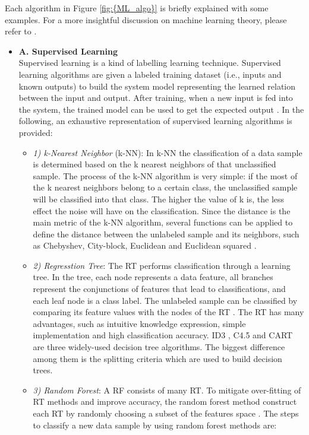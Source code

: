 Each algorithm in Figure \ref{fig:{ML_algo}} is briefly explained with some examples. For a more insightful discussion on machine learning theory, please refer to \cite{Mohammed2016, Marsland2015, Alpaydin2020}.
\begin{itemize}
\item[]\textbf{A. Supervised Learning}\\
Supervised learning is a kind of labelling learning technique. Supervised learning algorithms are given a labeled training dataset (i.e., inputs and known outputs) to build the system model representing the learned relation between the input and output. After training, when a new input is fed into the system, the trained model can be used to get the expected output \cite{Kotsiantis2007, Hastie2009}. In the following, an exhaustive representation of supervised learning algorithms is provided:
\begin{itemize}
\item[]\textit{1) k-Nearest Neighbor} (k-NN): In k-NN the classification of a data sample is determined based on the k nearest neighbors of that unclassified sample. The process of the k-NN algorithm is very simple: if the most of the k nearest neighbors belong to a certain class, the unclassified sample will be classified into that class. The higher the value of k is, the less effect the noise will have on the classification. Since the distance is the main metric of the k-NN algorithm, several functions can be applied to define the distance between the unlabeled sample and its neighbors, such as Chebyshev, City-block, Euclidean and Euclidean squared \cite{Cover1967}.
\item[]\textit{2) Regresstion Tree}: The RT performs classification through a learning tree. In the tree, each node represents a data feature, all branches represent the conjunctions of features that lead to classifications, and each leaf node is a class label. The unlabeled sample can be classified by comparing its feature values with the nodes of the RT \cite{Han2011}. The RT has many advantages, such as intuitive knowledge expression, simple implementation and high classification accuracy. ID3 \cite{Quinlan1986}, C4.5 \cite{Karatsiolis2012} and CART \cite{Burrows1995} are three widely-used decision tree algorithms. The biggest difference among them is the splitting criteria which are used to build decision trees. 
\item[]\textit{3) Random Forest}: A RF \cite{Breiman1999} consists of many RT. To mitigate over-fitting of RT methods and improve accuracy, the random forest method construct each RT by randomly choosing a subset of the features space . The steps to classify a new data sample by using random forest methods are:

\end{itemize}
\end{itemize}
